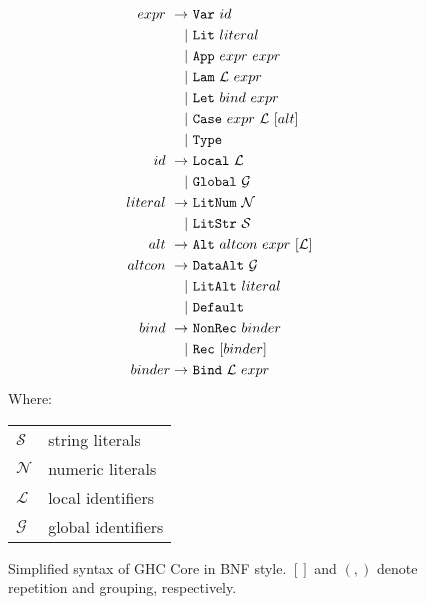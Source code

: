 \begin{figure}
  \begin{equation*}
    \begin{split}
      expr\    \rightarrow\ & \texttt{Var}\ id                          \\
                         |\ & \texttt{Lit}\ literal                     \\
                         |\ & \texttt{App}\ expr\ expr                  \\
                         |\ & \texttt{Lam}\ \mathcal{L}\ expr           \\
                         |\ & \texttt{Let}\ bind\ expr                  \\
                         |\ & \texttt{Case}\ expr\ \mathcal{L}\ [alt]   \\
                         |\ & \texttt{Type}                             \\
      id\      \rightarrow\ & \texttt{Local}\ \mathcal{L}               \\
                         |\ & \texttt{Global}\ \mathcal{G}              \\
      literal\ \rightarrow\ & \texttt{LitNum}\ \mathcal{N}              \\
                         |\ & \texttt{LitStr}\ \mathcal{S}              \\
      alt\     \rightarrow\ & \texttt{Alt}\ altcon\ expr\ [\mathcal{L}] \\
      altcon\  \rightarrow\ & \texttt{DataAlt}\ \mathcal{G}             \\
                         |\ & \texttt{LitAlt}\ literal                  \\
                         |\ & \texttt{Default}                          \\
      bind\    \rightarrow\ & \texttt{NonRec}\ binder                   \\
                         |\ & \texttt{Rec}\ [binder]                    \\
      binder   \rightarrow\ & \texttt{Bind}\ \mathcal{L}\ expr
    \end{split}
  \end{equation*}
  Where:
  \begin{tabular}[t]{l @{ $=$ } l}
    $\mathcal{S}$ & string literals    \\
    $\mathcal{N}$ & numeric literals   \\
    $\mathcal{L}$ & local identifiers  \\
    $\mathcal{G}$ & global identifiers
  \end{tabular}

  \caption{Simplified syntax of GHC Core in BNF style. $[]$ and $(,)$ denote repetition and grouping, respectively.}
  \label{fig:coresyntax}
\end{figure}

